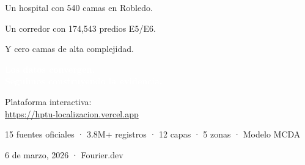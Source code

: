 \documentclass[aspectratio=169, 11pt]{beamer}
\begin{document}
{
\begin{frame}[plain]
\vfill
\begin{center}

{\large\textcolor{white!90}{Un hospital con 540 camas en Robledo.}}

\vspace{4pt}
{\large\textcolor{white!90}{Un corredor con 174,543 predios E5/E6.}}

\vspace{4pt}
{\large\textcolor{white!90}{Y cero camas de alta complejidad.}}

\vspace{20pt}

\vspace{18pt}
{\Large\bfseries\textcolor{white}{Los datos convergen.\\[4pt]
Seguimos construyendo la evidencia.}}

\vspace{20pt}
{\small\textcolor{white!70}{Plataforma interactiva:}}\\
{\small\textcolor{white!90}{\url{https://hptu-localizacion.vercel.app}}}

\vspace{10pt}
{\small\textcolor{white!50}{15 fuentes oficiales · 3.8M+ registros · 12 capas · 5 zonas · Modelo MCDA}}

\vspace{16pt}
{\footnotesize\textcolor{white!40}{6 de marzo, 2026 · Fourier.dev}}
\end{center}
\vfill
\end{frame}
}
\end{document}

